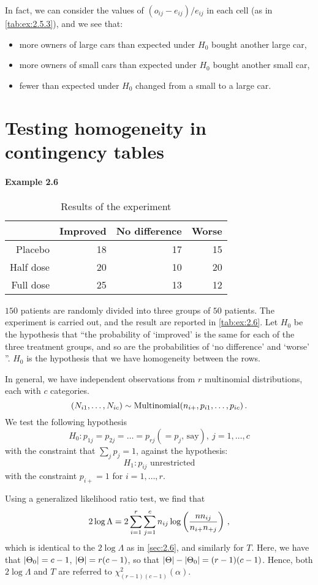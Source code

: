 In fact, we can consider the values of $(o_{ij} - e_{ij})/e_{ij}$ in each cell (as in \vref{tab:ex:2.5.3}), and we see that:
\begin{itemize}
\item more owners of large cars than expected under $H_0$ bought another large car,
\item more owners of small cars than expected under $H_0$ bought another small car,
\item fewer than expected under $H_0$ changed from a small to a large car.
\end{itemize}

\section{Testing homogeneity in contingency tables}
\label{sec:2.7}

\paragraph{Example 2.6}
\begin{table}[h]
  \centering
  \begin{tabular}{rrrr}
    \toprule
    & Improved & No difference & Worse \\
    \midrule
    Placebo & 18 & 17 & 15 \\
    Half dose & 20 & 10 & 20 \\
    Full dose & 25 & 13 & 12 \\
    \bottomrule
  \end{tabular}
  \caption{Results of the experiment}
  \label{tab:ex:2.6}
\end{table}

$150$ patients are randomly divided into three groups of $50$ patients. The experiment is carried out, and the result are reported in \vref{tab:ex:2.6}.
Let $H_0$ be the hypothesis that ``the probability of `improved' is the same for each of the three treatment groups, and so are the probabilities of `no difference' and `worse' ''.
$H_0$ is the hypothesis that we have homogeneity between the rows.

In general, we have independent observations from $r$ multinomial distributions, each with $c$ categories.
\[
(N_{i1}, \dotsc, N_{ic}) \sim \operatorname{Multinomial}(n_{i+}, p_{i1}, \dotsc, p_{ic}) \, {.}
\]
We test the following hypothesis
\[
H_0 : p_{1j} = p_{2j} = \dotsc = p_{rj} ( = p_j \text{, say}), \ j = 1, \dotsc, c
\]
with the constraint that $\sum_j p_j = 1$, against the hypothesis:
\[
H_1 : p_{ij} \text{ unrestricted}
\]
with the constraint $p_{i+} = 1$ for $i = 1, \dotsc, r$.

Using a generalized likelihood ratio test, we find that
\[
2 \log \Lambda = 2 \sum_{i = 1}^r \sum_{j = 1}^c n_{ij} \log \left( \frac{n n_{ij}}{n_{i+}n_{+j}} \right) \, {,}
\]
which is identical to the $2 \log \Lambda$ as in \cref{sec:2.6}, and similarly for $T$.
Here, we have that $\lvert\Theta_0\rvert = c-1$, $\lvert\Theta\rvert = r(c-1)$, so that $\lvert\Theta\rvert - \lvert\Theta_0\rvert = (r-1)(c-1)$.
Hence, both $2 \log \Lambda$ and $T$ are referred to $\chi^2_{(r-1)(c-1)} (\alpha)$.


